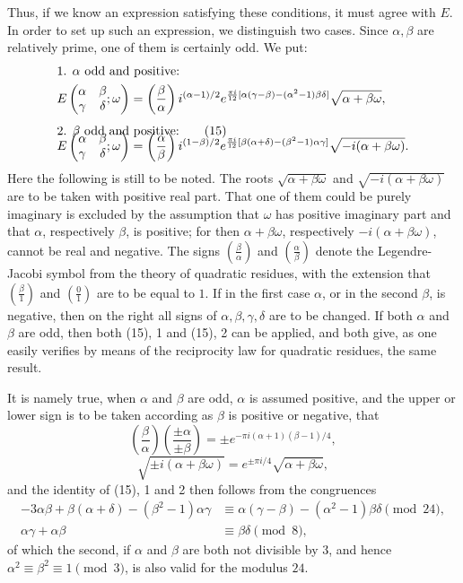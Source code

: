 \documentclass[11pt]{article}
\newcommand{\Jac}[2]{\left(\frac{#1}{#2}\right)}
\begin{document}
Thus, if we know an expression satisfying these conditions, it must agree with $E$. In order to set up such an expression, we distinguish two cases. Since $\alpha,\beta$ are relatively prime, one of them is certainly odd. We put:
\begin{align}
&\text{1. }\alpha\text{ odd and positive:}
\notag\\
&E\left(\begin{matrix}\alpha&\beta\\\gamma&\delta\end{matrix};\omega\right)
=\Jac{\beta}{\alpha} i^{(\alpha-1)/2}
 e^{{\pi i\over12}[\alpha(\gamma-\beta)-(\alpha^2-1)\beta\delta]}
 \sqrt{\alpha+\beta\omega},
\notag\\[0.4em]
&\text{2. }\beta\text{ odd and positive:}
\tag{15}\\[-1.0em]
&E\left(\begin{matrix}\alpha&\beta\\\gamma&\delta\end{matrix};\omega\right)
=\Jac{\alpha}{\beta} i^{(1-\beta)/2}
 e^{{\pi i\over12}[\beta(\alpha+\delta)-(\beta^2-1)\alpha\gamma]}
 \sqrt{-i(\alpha+\beta\omega)}.
\notag
\end{align}
Here the following is still to be noted. The roots $\sqrt{\alpha+\beta\omega}$ and $\sqrt{-i(\alpha+\beta\omega)}$ are to be taken with positive real part. That one of them could be purely imaginary is excluded by the assumption that $\omega$ has positive imaginary part and that $\alpha$, respectively $\beta$, is positive; for then $\alpha+\beta\omega$, respectively $-i(\alpha+\beta\omega)$, cannot be real and negative. The signs $\Jac{\beta}{\alpha}$ and $\Jac{\alpha}{\beta}$ denote the Legendre-Jacobi symbol from the theory of quadratic residues, with the extension that $\Jac{\beta}{1}$ and $\Jac{0}{1}$ are to be equal to $1$. If in the first case $\alpha$, or in the second $\beta$, is negative, then on the right all signs of $\alpha,\beta,\gamma,\delta$ are to be changed. If both $\alpha$ and $\beta$ are odd, then both (15), 1 and (15), 2 can be applied, and both give, as one easily verifies by means of the reciprocity law for quadratic residues, the same result.

It is namely true, when $\alpha$ and $\beta$ are odd, $\alpha$ is assumed positive, and the upper or lower sign is to be taken according as $\beta$ is positive or negative, that
\[
\Jac{\beta}{\alpha}\Jac{\pm\alpha}{\pm\beta}
=\pm e^{-\pi i(\alpha+1)(\beta-1)/4},
\]
\[
\sqrt{\pm i(\alpha+\beta\omega)}=e^{\pm\pi i/4}\sqrt{\alpha+\beta\omega},
\]
and the identity of (15), 1 and 2 then follows from the congruences
\begin{align*}
-3\alpha\beta+\beta(\alpha+\delta)-(\beta^2-1)\alpha\gamma
&\equiv \alpha(\gamma-\beta)-(\alpha^2-1)\beta\delta \pmod{24},\\
\alpha\gamma+\alpha\beta&\equiv \beta\delta \pmod8,
\end{align*}
of which the second, if $\alpha$ and $\beta$ are both not divisible by $3$, and hence $\alpha^2\equiv\beta^2\equiv1\pmod3$, is also valid for the modulus $24$.
\end{document}
